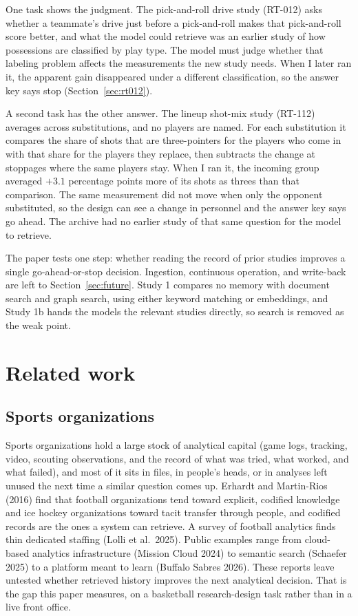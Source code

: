 \documentclass[11pt]{article}
\begin{document}
One task shows the judgment. The pick-and-roll drive study (RT-012) asks whether a teammate's drive just before a pick-and-roll makes that pick-and-roll score better, and what the model could retrieve was an earlier study of how possessions are classified by play type. The model must judge whether that labeling problem affects the measurements the new study needs. When I later ran it, the apparent gain disappeared under a different classification, so the answer key says stop (Section~\ref{sec:rt012}).

A second task has the other answer. The lineup shot-mix study (RT-112) averages across substitutions, and no players are named. For each substitution it compares the share of shots that are three-pointers for the players who come in with that share for the players they replace, then subtracts the change at stoppages where the same players stay. When I ran it, the incoming group averaged $+3.1$ percentage points more of its shots as threes than that comparison. The same measurement did not move when only the opponent substituted, so the design can see a change in personnel and the answer key says go ahead. The archive had no earlier study of that same question for the model to retrieve.

The paper tests one step: whether reading the record of prior studies improves a single go-ahead-or-stop decision. Ingestion, continuous operation, and write-back are left to Section~\ref{sec:future}. Study 1 compares no memory with document search and graph search, using either keyword matching or embeddings, and Study 1b hands the models the relevant studies directly, so search is removed as the weak point.

\section{Related work}
\label{sec:related}

\subsection{Sports organizations}

Sports organizations hold a large stock of analytical capital (game logs, tracking, video, scouting observations, and the record of what was tried, what worked, and what failed), and most of it sits in files, in people's heads, or in analyses left unused the next time a similar question comes up. Erhardt and Martin-Rios (2016) find that football organizations tend toward explicit, codified knowledge and ice hockey organizations toward tacit transfer through people, and codified records are the ones a system can retrieve. A survey of football analytics finds thin dedicated staffing (Lolli et al.\ 2025). Public examples range from cloud-based analytics infrastructure (Mission Cloud 2024) to semantic search (Schaefer 2025) to a platform meant to learn (Buffalo Sabres 2026). These reports leave untested whether retrieved history improves the next analytical decision. That is the gap this paper measures, on a basketball research-design task rather than in a live front office.
\end{document}
